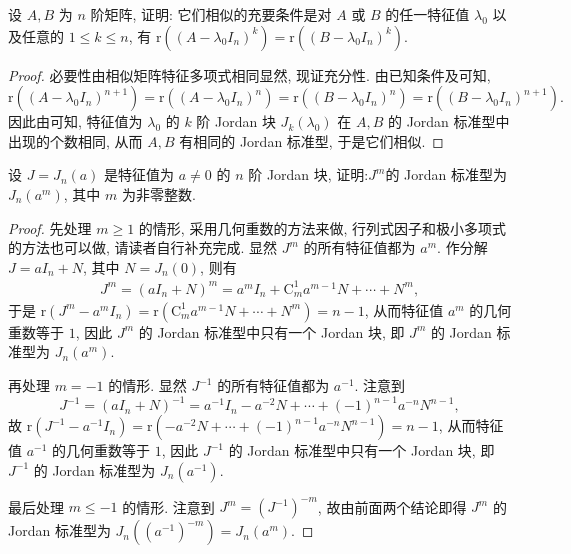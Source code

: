 \documentclass[../../main.tex]{subfiles}%
\begin{document}
\begin{proposition}\label{proposition:矩阵相似的充要条件(关于秩的充要条件)}
设 $A,B$ 为 $n$ 阶矩阵, 证明: 它们相似的充要条件是对 $A$ 或 $B$ 的任一特征值 $\lambda_0$ 以及任意的 $1 \leqslant  k \leqslant  n$, 有 $\mathrm{r}((A - \lambda_0 I_n)^k) = \mathrm{r}((B - \lambda_0 I_n)^k)$.
\end{proposition}
\begin{proof}

必要性由相似矩阵特征多项式相同显然, 现证充分性. 由已知条件及可知,
\[
\mathrm{r}((A - \lambda_0 I_n)^{n + 1}) = \mathrm{r}((A - \lambda_0 I_n)^n) = \mathrm{r}((B - \lambda_0 I_n)^n) = \mathrm{r}((B - \lambda_0 I_n)^{n + 1}).
\]
因此由可知, 特征值为 $\lambda_0$ 的 $k$ 阶 Jordan 块 $J_k(\lambda_0)$ 在 $A,B$ 的 Jordan 标准型中出现的个数相同, 从而 $A,B$ 有相同的 Jordan 标准型, 于是它们相似.

\end{proof}

\begin{proposition}\label{proposition:Jordan块的m次方的Jordan标准型}
设 $J = J_n(a)$ 是特征值为 $a \neq 0$ 的 $n$ 阶 Jordan 块, 证明:$J^m$的 Jordan 标准型为$J_n(a^m)$, 其中 $m$ 为非零整数.
\end{proposition}
\begin{proof}

先处理 $m \geqslant  1$ 的情形, 采用几何重数的方法来做, 行列式因子和极小多项式的方法也可以做, 请读者自行补充完成. 显然 $J^m$ 的所有特征值都为 $a^m$. 作分解 $J = aI_n + N$, 其中 $N = J_n(0)$, 则有
\begin{align*}
J^m = (aI_n + N)^m = a^mI_n + \mathrm{C}_m^1a^{m - 1}N + \cdots + N^m,
\end{align*}
于是 $\mathrm{r}(J^m - a^mI_n) = \mathrm{r}(\mathrm{C}_m^1a^{m - 1}N + \cdots + N^m) = n - 1$, 从而特征值 $a^m$ 的几何重数等于 $1$, 因此 $J^m$ 的 Jordan 标准型中只有一个 Jordan 块, 即 $J^m$ 的 Jordan 标准型为 $J_n(a^m)$.

再处理 $m = -1$ 的情形. 显然 $J^{-1}$ 的所有特征值都为 $a^{-1}$. 注意到
\[
J^{-1} = (aI_n + N)^{-1} = a^{-1}I_n - a^{-2}N + \cdots + (-1)^{n - 1}a^{-n}N^{n - 1},
\]
故 $\mathrm{r}(J^{-1} - a^{-1}I_n) = \mathrm{r}(-a^{-2}N + \cdots + (-1)^{n - 1}a^{-n}N^{n - 1}) = n - 1$, 从而特征值 $a^{-1}$ 的几何重数等于 $1$, 因此 $J^{-1}$ 的 Jordan 标准型中只有一个 Jordan 块, 即 $J^{-1}$ 的 Jordan 标准型为 $J_n(a^{-1})$.

最后处理 $m \leqslant  -1$ 的情形. 注意到 $J^m = (J^{-1})^{-m}$, 故由前面两个结论即得 $J^m$ 的 Jordan 标准型为 $J_n((a^{-1})^{-m}) = J_n(a^m)$. 

\end{proof}
\end{document}
